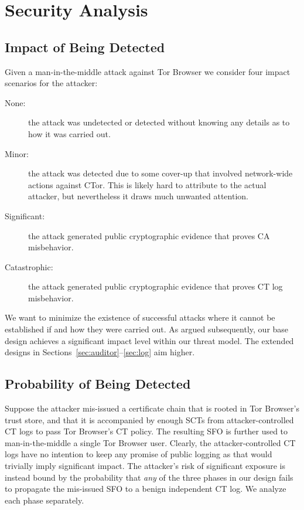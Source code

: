 \section{Security Analysis} \label{sec:analysis}

\subsection{Impact of Being Detected} \label{sec:analysis:impact}
Given a man-in-the-middle attack against Tor Browser we consider four impact
scenarios for the attacker:
\begin{description}
	\item[None:] the attack was undetected or detected without knowing any
		details as to how it was carried out.
	\item[Minor:] the attack was detected due to some cover-up that involved
		network-wide actions against CTor.  This is likely hard to attribute to
		the actual attacker, but nevertheless it draws much unwanted attention.
	\item[Significant:] the attack generated public cryptographic evidence
		that proves CA misbehavior.
	\item[Catastrophic:] the attack generated public cryptographic evidence
		that proves CT log misbehavior.
\end{description}

We want to minimize the existence of successful attacks where it cannot be
established if and how they were carried out.  As argued subsequently, our
base design achieves a significant impact level within our threat model.  The
extended designs in Sections~\ref{sec:auditor}--\ref{sec:log} aim higher.

\subsection{Probability of Being Detected} \label{sec:analysis:pr}
Suppose the attacker mis-issued a certificate chain that is rooted in Tor
Browser's trust store, and that it is accompanied by enough SCTs from
attacker-controlled CT logs to pass Tor Browser's CT policy.  The resulting SFO
is further used to man-in-the-middle a single Tor Browser user.  Clearly, the
attacker-controlled CT logs have no intention to keep any promise of public
logging as that would trivially imply significant impact.  The attacker's risk
of significant exposure is instead bound by the probability that \emph{any} of
the three phases in our design fails to propagate the mis-issued SFO to a benign
independent CT log.  We analyze each phase separately.


